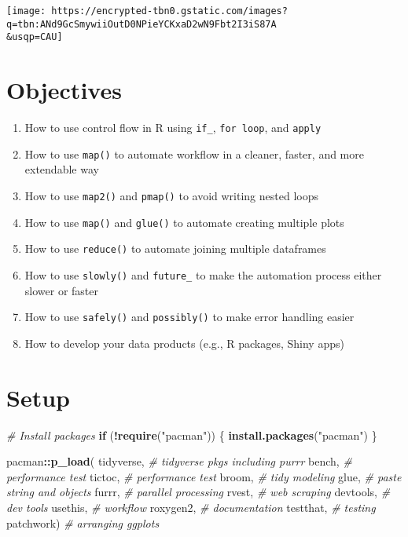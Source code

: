\documentclass[
]{book}
\newenvironment{Shaded}{\begin{snugshade}}{\end{snugshade}}
\newcommand{\CommentTok}[1]{\textcolor[rgb]{0.56,0.35,0.01}{\textit{#1}}}
\newcommand{\ControlFlowTok}[1]{\textcolor[rgb]{0.13,0.29,0.53}{\textbf{#1}}}
\newcommand{\KeywordTok}[1]{\textcolor[rgb]{0.13,0.29,0.53}{\textbf{#1}}}
\newcommand{\NormalTok}[1]{#1}
\newcommand{\OperatorTok}[1]{\textcolor[rgb]{0.81,0.36,0.00}{\textbf{#1}}}
\newcommand{\StringTok}[1]{\textcolor[rgb]{0.31,0.60,0.02}{#1}}
\providecommand{\tightlist}{%
  \setlength{\itemsep}{0pt}\setlength{\parskip}{0pt}}
\begin{document}
\texttt{[image: https://encrypted-tbn0.gstatic.com/images?q=tbn:ANd9GcSmywiiOutD0NPieYCKxaD2wN9Fbt2I3iS87A\\\&usqp=CAU]}

\hypertarget{objectives}{%
\section{Objectives}\label{objectives}}

\begin{enumerate}
\def\labelenumi{\arabic{enumi}.}
\setcounter{enumi}{-1}
\tightlist
\item
  How to use control flow in R using \texttt{if\_}, \texttt{for\ loop}, and \texttt{apply}
\item
  How to use \texttt{map()} to automate workflow in a cleaner, faster, and more extendable way\\
\item
  How to use \texttt{map2()} and \texttt{pmap()} to avoid writing nested loops
\item
  How to use \texttt{map()} and \texttt{glue()} to automate creating multiple plots
\item
  How to use \texttt{reduce()} to automate joining multiple dataframes
\item
  How to use \texttt{slowly()} and \texttt{future\_} to make the automation process either slower or faster
\item
  How to use \texttt{safely()} and \texttt{possibly()} to make error handling easier
\item
  How to develop your data products (e.g., R packages, Shiny apps)
\end{enumerate}

\hypertarget{setup-3}{%
\section{Setup}\label{setup-3}}

\begin{Shaded}
\begin{Highlighting}[]
\CommentTok{\# Install packages}
\ControlFlowTok{if}\NormalTok{ (}\OperatorTok{!}\KeywordTok{require}\NormalTok{(}\StringTok{"pacman"}\NormalTok{)) \{}
  \KeywordTok{install.packages}\NormalTok{(}\StringTok{"pacman"}\NormalTok{)}
\NormalTok{\}}

\NormalTok{pacman}\OperatorTok{::}\KeywordTok{p\_load}\NormalTok{(}
\NormalTok{  tidyverse, }\CommentTok{\# tidyverse pkgs including purrr}
\NormalTok{  bench, }\CommentTok{\# performance test }
\NormalTok{  tictoc, }\CommentTok{\# performance test}
\NormalTok{  broom, }\CommentTok{\# tidy modeling}
\NormalTok{  glue, }\CommentTok{\# paste string and objects}
\NormalTok{  furrr, }\CommentTok{\# parallel processing}
\NormalTok{  rvest, }\CommentTok{\# web scraping}
\NormalTok{  devtools, }\CommentTok{\# dev tools }
\NormalTok{  usethis, }\CommentTok{\# workflow     }
\NormalTok{  roxygen2, }\CommentTok{\# documentation }
\NormalTok{  testthat, }\CommentTok{\# testing }
\NormalTok{  patchwork) }\CommentTok{\# arranging ggplots }
\end{Highlighting}
\end{Shaded}
\end{document}
